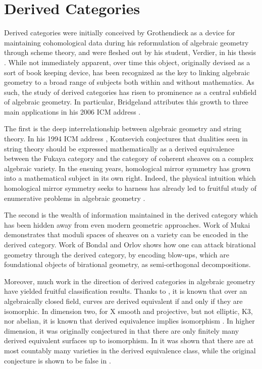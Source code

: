 \section*{Derived Categories}
Derived categories were initially conceived by Grothendieck as a device for maintaining cohomological data during his reformulation of algebraic geometry through scheme theory, and were fleshed out by his student, Verdier, in his thesis \parencite{Verdier}.
While not immediately apparent, over time this object, originally devised as a sort of book keeping device, has been recognized as the key to linking algebraic geometry to a broad range of subjects both within and without mathematics.
As such, the study of derived categories has risen to prominence as a central subfield of algebraic geometry.
In particular, Bridgeland attributes this growth to three main applications in his 2006 ICM address \parencite{Bridgeland06}.

The first is the deep interrelationship between algebraic geometry and string theory.
In his 1994 ICM address \parencite{Kontsevich95}, Kontsevich conjectures that dualities seen in string theory should be expressed mathematically as a derived equivalence between the Fukaya category and the category of coherent sheaves on a complex algebraic variety.
In the ensuing years, homological mirror symmetry has grown into a mathematical subject in its own right.
Indeed, the physical intuition which homological mirror symmetry seeks to harness has already led to fruitful study of enumerative problems in algebraic geometry \parencite{enumerative}.

The second is the wealth of information maintained in the derived category which has been hidden away from even modern geometric approaches.
Work of Mukai \parencite{Mukai81,Mukai87} demonstrates that moduli spaces of sheaves on a variety can be encoded in the derived category.
Work of Bondal and Orlov \parencite{Bondal-Orlov} shows how one can attack birational geometry through the derived category, by encoding blow-ups, which are foundational objects of birational geometry, as semi-orthogonal decompositions.

Moreover, much work in the direction of derived categories in algebraic geometry have yielded fruitful classification results.
Thanks to \parencite{Orlov97}, it is known that over an algebraically closed field, curves are derived equivalent if and only if they are isomorphic.
In dimension two, for X smooth and projective, but not elliptic, K3, nor abelian, it is known that derived equivalence implies isomorphism \parencite[Prop. 12.1]{HuybrechtsFMT}.
In higher dimension, it was originally conjectured in \parencite{Kawamata02} that there are only finitely many derived equivalent surfaces up to isomorphism.
In \parencite{Anel-Toen09} it was shown that there are at most countably many varieties in the derived equivalence class, while the original conjecture is shown to be false in \parencite{Lesieutre15}.

